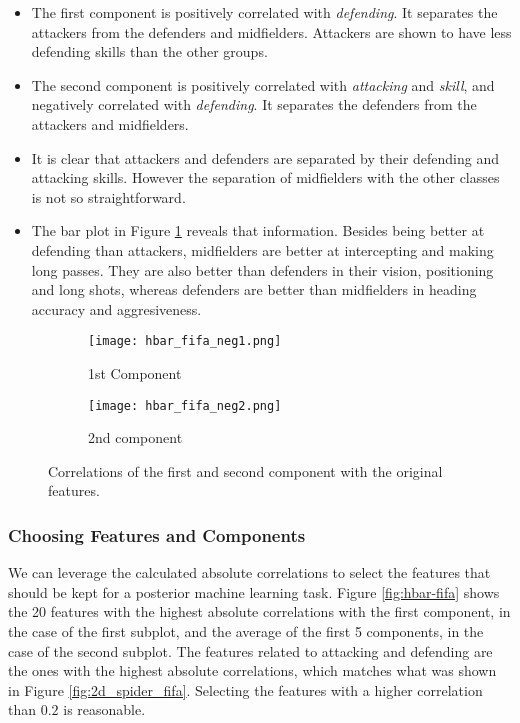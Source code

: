 \begin{itemize}
    \item The first component is positively correlated with \textit{defending}. It separates the attackers from the defenders and midfielders. Attackers are shown to have less defending skills than the other groups.
    \item The second component is positively correlated with \textit{attacking} and \textit{skill}, and negatively correlated with \textit{defending}. It separates the defenders from the attackers and midfielders.
    \item It is clear that attackers and defenders are separated by their defending and attacking skills. However the separation of midfielders with the other classes is not so straightforward.
    \item The bar plot in Figure \ref{fig:hbar-fifa-neg} reveals that information. Besides being better at defending than attackers, midfielders are better at intercepting and making long passes. They are also better than defenders in their vision, positioning and long shots, whereas defenders are better than midfielders in heading accuracy and aggresiveness.
\end{itemize}

\begin{figure}[!ht]
    \centering
    \begin{subfigure}{.49\textwidth}
        \centering
        \texttt{[image: hbar\_fifa\_neg1.png]}
        \caption{1st Component}
    \end{subfigure}
    \begin{subfigure}{.49\textwidth}
        \centering
        \texttt{[image: hbar\_fifa\_neg2.png]}
        \caption{2nd component}
    \end{subfigure}
    \caption{Correlations of the first and second component with the original features.}
    \label{fig:hbar-fifa-neg}
\end{figure}

\subsubsection{Choosing Features and Components}

We can leverage the calculated absolute correlations to select the features that should be kept for a posterior machine learning task. Figure \ref{fig:hbar-fifa} shows the 20 features with the highest absolute correlations with the first component, in the case of the first subplot, and the average of the first 5 components, in the case of the second subplot.
The features related to attacking and defending are the ones with the highest absolute correlations, which matches what was shown in Figure \ref{fig:2d_spider_fifa}. Selecting the features with a higher correlation than $0.2$ is reasonable.

